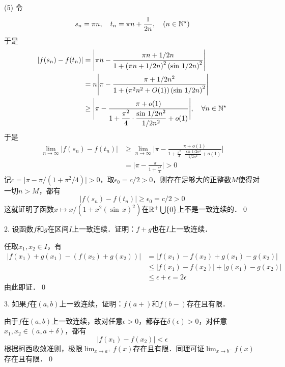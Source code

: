 (5) \prove 令
\begin{equation}
    s_n = \pi n, \quad t _n = \pi n + \frac{1}{2n}, \quad \left(n \in \mathbb{N}^\star\right)
\end{equation}
于是
\begin{align}
    \lvert f(s_n) - f(t_n) \rvert &= \Bigg\lvert \pi n - \frac{\pi n + 1/2n}{1 + \left(\pi n + 1/2n\right)^2 \left(\sin \, 1/ 2n\right)^2} \Bigg\rvert \\
    &= n \Bigg\lvert \pi - \frac{\pi + 1/2n^2}{1+\left(\pi^2 n^2 + O(1)\right) \left(\sin \, 1/2n\right)^2} \Bigg\rvert \\
    &\geq \Bigg\lvert \pi - \frac{\pi + o(1)}{1+ \displaystyle\frac{\pi^2}{4} \cdot \displaystyle\frac{\sin \, 1/2n^2}{1/2n^2} + o(1)} \Bigg\rvert, \quad \forall n \in \mathbb{N}^\star
\end{align}
于是
\begin{align}
    \lim_{n \to \infty} \lvert f(s_n) - f(t_n) \rvert &\geq \lim_{n \to \infty} \Bigg\lvert \pi - \frac{\pi + o(1)}{1 + \displaystyle\frac{\pi^2}{4} \cdot \displaystyle\frac{\sin \, 1/2n^2}{1/2n^2} + o(1) } \Bigg\rvert \\
    &= \Bigg\lvert \pi - \frac{\pi}{1+\displaystyle\frac{\pi^2}{4}} \Bigg\rvert > 0
\end{align}
记$c = \lvert \pi - \pi/(1+\pi^2/4) \rvert > 0$，取$\epsilon_0 = c/2 > 0$，则存在足够大的正整数$M$使得对一切$n > M$，都有
\begin{equation}
    \lvert f(s_n) - f(t_n) \rvert \geq \epsilon_0 = c/2 > 0
\end{equation}
这就证明了函数$x \mapsto x/(1+x^2 \left(\sin \, x\right)^2)$在$\mathbb{R}^+ \bigcup \{ 0 \}$上不是一致连续的．\qed\bigskip

2. 设函数$f$和$g$在区间$I$上一致连续．证明：$f+g$也在$I$上一致连续．

\prove 任取$x_1, x_2 \in I$，有
\begin{align}
    \lvert f(x_1) + g(x_1) - (f(x_2) + g(x_2)) \rvert &= \lvert f(x_1) - f(x_2) + g(x_1) - g(x_2) \rvert \\
    &\leq \lvert f(x_1) - f(x_2) \rvert + \lvert g(x_1) - g(x_2) \rvert \\
    &\leq \epsilon + \epsilon = 2\epsilon
\end{align}
由此即证．\qed\bigskip

3. 如果$f$在$(a,b)$上一致连续，证明：$f(a+)$和$f(b-)$存在且有限．

\prove 由于$f$在$(a,b)$上一致连续，故对任意$\epsilon > 0$，都存在$\delta(\epsilon) > 0$，对任意$x_1, x_2 \in (a, a+\delta)$，都有
\begin{equation}
    \lvert f(x_1) - f(x_2) \rvert < \epsilon
\end{equation}
根据柯西收敛准则，极限$\displaystyle\lim_{x \to a^+} f(x)$存在且有限．同理可证$\displaystyle\lim_{x \to b^-} f(x)$存在且有限．\qed\bigskip